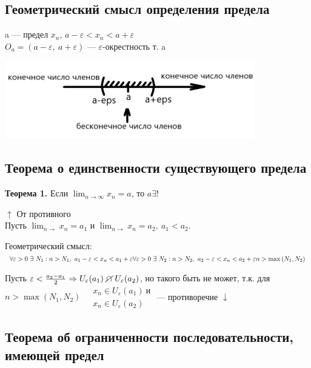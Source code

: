 \documentclass{article}
\begin{document}
    \subsection{Геометрический смысл определения предела}
    
    a --- предел \( x_n \), \(a - \varepsilon < x_n < a + \varepsilon\)\\
	\(O_a = (a - \varepsilon,\ a + \varepsilon)\) --- \(\varepsilon\)-окрестность т. a

	\includegraphics[scale=0.7]{21_0}
    
    \subsection{Теорема о единственности существующего предела}
    
    \textbf{Теорема 1.} Если \(\lim_{n \rightarrow \infty}{x_n} = a\), то \(a \exists !\)
    
    \(\uparrow\) От противного
    \\ Пусть \(\lim_{n \rightarrow}{x_n} = a_1\) и \(\lim_{n \rightarrow}{x_n} = a_2,\ a_1 < a_2\).
    
    Геометрический смысл:\\
    \(\forall \varepsilon > 0 \ \exists \  N_1 : n > N_1,\ a_1 - \varepsilon < x_n < a_1 + \varepsilon\\ \forall \varepsilon > 0 \ \exists \  N_2 : n > N_2,\ a_2 - \varepsilon < x_n < a_2 + \varepsilon
    \\ n > \max{(N_1, N_2)}\)
    
    Пусть \(\varepsilon < \frac{a_2 - a_1}{2} \Rightarrow U_{\varepsilon}(a_1)\ \cancel{\cap}\ U_{\varepsilon}(a_2)\), но такого быть не может, т.к. для \(n > \max{(N_1, N_2)}\
    \begin{aligned}
    	&x_n \in U_{\varepsilon}(a_1)\ \textrm{и}\\
        &x_n \in U_{\varepsilon}(a_2)
    \end{aligned}\) --- противоречие \(\downarrow\)
    
    \subsection{Теорема об ограниченности последовательности, имеющей предел}
    
\end{document}
